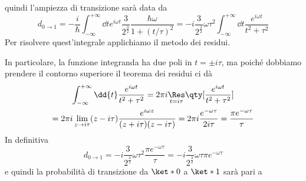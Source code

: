 \begin{soluzione}
\begin{itemize}[leftmargin=0.5cm]
   quindi l'ampiezza di transizione sarà data da
   \begin{equation*}
      d_{0 \to 1}
      =-\frac{i}{\hbar} \int_{-\infty}^{+\infty} \dd{t} e^{i \omega t} \frac{3}{2^{\frac{3}{2}}} \frac{\hbar\omega}{1 + (t/\tau)^2}
      =-i \frac{3}{2^{\frac{3}{2}}} \omega \tau^2 \int_{-\infty}^{+\infty} \dd{t} \frac{e^{i \omega t}}{t^2 + \tau^2}
   \end{equation*}
   Per risolvere quest'integrale applichiamo il metodo dei residui.
   \begin{figure}[H]
      \centering
   \end{figure}
   In particolare, la funzione integranda ha due poli in $t=\pm i \tau$, ma poiché dobbiamo prendere il contorno superiore il teorema dei residui ci dà
   \begin{gather*}
      \int_{-\infty}^{+\infty} \dd{t} \frac{e^{i \omega t}}{t^2 + \tau^2}
      =2\pi i \underset{t=i\tau}{\Res} \qty[ \frac{e^{i \omega t}}{t^2 + \tau^2} ]
      \\
      =2\pi i \lim_{z \to i\tau} (z - i\tau) \frac{e^{i \omega z}}{(z + i\tau)(z - i\tau)}
      =2\pi i \frac{e^{-\omega \tau}}{2i\tau}
      =\frac{\pi e^{-\omega \tau}}{\tau}
   \end{gather*}
   In definitiva
   \begin{equation*}
      d_{0 \to 1}
      =-i \frac{3}{2^{\frac{3}{2}}} \omega \tau^2 \frac{\pi e^{-\omega \tau}}{\tau}
      =-i\frac{3}{2^{\frac{3}{2}}} \omega \tau \pi e^{-\omega \tau}
   \end{equation*}
   e quindi la probabilità di transizione da $\ket*{0}$ a $\ket*{1}$ sarà pari a

\end{itemize}
\end{soluzione}
